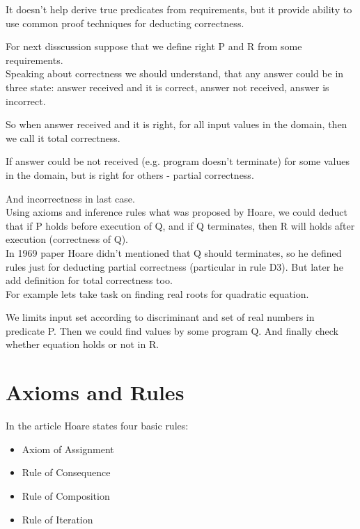 \documentclass[twoside,twocolumn]{article}
\begin{document}
It doesn't help derive true predicates from requirements, but it
provide ability to use common proof techniques for deducting correctness.

For next disscussion suppose that we define right P and R from some
requirements. \\

Speaking about correctness we should understand, that any answer could be in
three state: answer received and it is correct, answer not received, answer is
incorrect.  

So when answer received and it is right, for all input values in the domain,
then we call it total correctness.

If answer could be not received (e.g. program doesn't terminate) for some values
in the domain, but is right for others - partial correctness.

And incorrectness in last case. \\

Using axioms and inference rules what was proposed by Hoare, we could deduct
that if P holds before execution of Q, and if Q terminates, then R will holds
after execution (correctness of Q).\\

In 1969 paper Hoare didn't mentioned that Q should terminates, so he defined
rules just for deducting partial correctness (particular in rule D3). But later
he add definition for total correctness too. \\

For example lets take task on finding real roots for quadratic equation.

We limits input set according to discriminant and set of real numbers in
predicate P. Then we could find values by some program Q. And finally check
whether equation holds or not in R. 



\section{Axioms and Rules}

In the article Hoare states four basic rules:
\begin{itemize}
\item
  Axiom of Assignment
\item
  Rule of Consequence
\item
  Rule of Composition
\item
  Rule of Iteration
\end{itemize}
\end{document}
